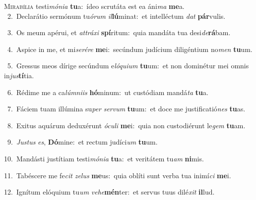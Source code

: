 \lettrine{\initial\textcolor{\initialcolor}{M}}{irabília} testi\-\textit{mó}\-\textit{ni}\textit{a} \textbf{tu}\-a:~\star ídeo scrutáta est ea áni\textit{ma} \textbf{me}\-a.\\
{\numbfont\textcolor{\numbcolor}{~2.}}~Declarátio sermónum tu\-\textit{ó}\-\textit{rum} \textit{il}\-\textbf{lú}minat:~\star et intelléctum \textit{dat} \textbf{pár}\-vulis.\par
{\numbfont\textcolor{\numbcolor}{~3.}}~Os meum apérui, et \textit{at}\-\textit{trá}\textit{xi} \textbf{spí}\-ritum:~\star quia mandáta tua desi\-\textit{de}\-\textbf{rá}bam.\par
{\numbfont\textcolor{\numbcolor}{~4.}}~Aspice in me, et mi\-\textit{se}\-\textit{ré}\textit{re} \textbf{me}\-i:~\star secúndum judícium diligéntium no\textit{men} \textbf{tu}\-um.\par
{\numbfont\textcolor{\numbcolor}{~5.}}~Gressus meos dírige secúndum e\-\textit{ló}\-\textit{qui}\textit{um} \textbf{tu}\-um:~\star et non dominétur mei omnis in\-\textit{jus}\-\textbf{tí}tia.\par
{\numbfont\textcolor{\numbcolor}{~6.}}~Rédime me a ca\-\textit{lúm}\-\textit{ni}\textit{is} \textbf{hó}\-minum:~\star ut custódiam mandá\textit{ta} \textbf{tu}\-a.\par
{\numbfont\textcolor{\numbcolor}{~7.}}~Fáciem tuam illúmina su\textit{per} \textit{ser}\-\textit{vum} \textbf{tu}\-um:~\star et doce me justificatió\textit{nes} \textbf{tu}\-as.\par
{\numbfont\textcolor{\numbcolor}{~8.}}~Exitus aquárum deduxérunt \textit{ó}\-\textit{cu}\textit{li} \textbf{me}\-i:~\star quia non custodiérunt le\textit{gem} \textbf{tu}\-am.\par
{\numbfont\textcolor{\numbcolor}{~9.}}~\-\textit{Jus}\-\textit{tus} \textit{es}\-, \textbf{Dó}\-mine:~\star et rectum judíci\textit{um} \textbf{tu}\-um.\par
{\numbfont\textcolor{\numbcolor}{10.}}~Mandásti justítiam testi\-\textit{mó}\-\textit{ni}\textit{a} \textbf{tu}\-a:~\star et veritátem tu\textit{am} \textbf{ni}\-mis.\par
{\numbfont\textcolor{\numbcolor}{11.}}~Tabéscere me fe\textit{cit} \textit{ze}\-\textit{lus} \textbf{me}\-us:~\star quia oblíti sunt verba tua inimí\textit{ci} \textbf{me}\-i.\par
{\numbfont\textcolor{\numbcolor}{12.}}~Ignítum elóquium tu\textit{um} \textit{ve}\-\textit{he}\textbf{mén}ter:~\star et servus tuus dilé\textit{xit} \textbf{il}\-lud.\par
